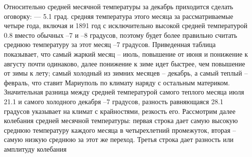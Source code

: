 
Относительно средней месячной температуры за декабрь приходится сделать
оговорку: — 5.1 град. средняя температура этого месяца за рассматриваемые
четыре года, включая и 1891 год с исключительно  высокой средней температурой
0.8 вместо обычных –7 и –8 градусов, поэтому будет более правильно считать
среднюю температуру за этот месяц –7 градусов. Приведенная таблица показывает,
что самый жаркий месяц – июль, повышение от июня и понижение к августу почти
одинаково, далее понижение к зиме идет быстрее, чем повышение от зимы к лету;
самый холодный из зимних месяцев – декабрь, а самый теплый – февраль, что
ставит Мариуполь по климату наряду с остальным материком. Значительная разница
между средней температурой самого теплого месяца июля 21.1 и самого холодного
декабря –7 градусов, разность равняющаяся 28.1 градусов указывает на климат с
крайностями, резкость его. Рассмотрим далее колебания средней месячной
температуры: первая строка дает самую высокую среднюю температуру каждого
месяца в четырехлетний промежуток, вторая – самую низкую среднюю за этот же
переход. Третья строка дает разность или амплитуду колебания


